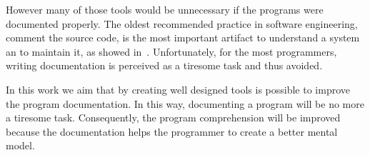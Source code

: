However many of those tools would be unnecessary if the programs were documented properly. The oldest recommended practice in software engineering, comment the source code, is the most important artifact to understand a system an to maintain it, as showed in~\cite{de2005study}. Unfortunately, for the most programmers, writing documentation is perceived as a tiresome task and thus avoided.

In this work we aim that by creating well designed tools is possible to improve the program documentation. In this way, documenting a program will be no more a tiresome task. Consequently, the program comprehension will be improved because the documentation helps the programmer to create a better mental model.